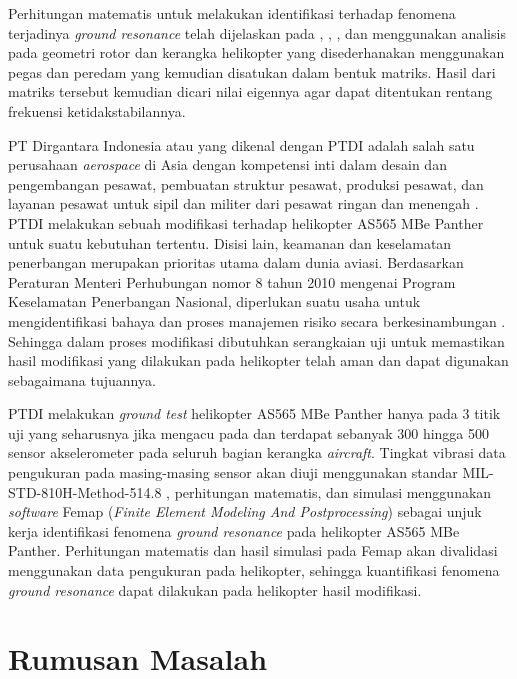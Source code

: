 Perhitungan matematis untuk melakukan identifikasi terhadap fenomena terjadinya \textit{ground resonance} telah dijelaskan pada \cite{Bergeot_passive}, \cite{BERGEOT201672}, \cite{borgesdasilva:hal-02188554}, dan \cite{DASIL} menggunakan analisis pada geometri rotor dan kerangka helikopter yang disederhanakan menggunakan pegas dan peredam yang kemudian disatukan dalam bentuk matriks. Hasil dari matriks tersebut kemudian dicari nilai eigennya agar dapat ditentukan rentang frekuensi ketidakstabilannya.

PT Dirgantara Indonesia atau yang dikenal dengan PTDI adalah salah satu perusahaan \textit{aerospace} di Asia dengan kompetensi inti dalam desain dan pengembangan pesawat, pembuatan struktur pesawat, produksi pesawat, dan layanan pesawat untuk sipil dan militer dari pesawat ringan dan menengah \cite{PTDI}. PTDI melakukan sebuah modifikasi terhadap helikopter AS565 MBe Panther untuk suatu kebutuhan tertentu. Disisi lain, keamanan dan keselamatan penerbangan merupakan prioritas utama dalam dunia aviasi. Berdasarkan Peraturan Menteri Perhubungan nomor 8 tahun 2010 mengenai Program Keselamatan Penerbangan Nasional, diperlukan suatu usaha untuk mengidentifikasi bahaya dan proses manajemen risiko secara berkesinambungan \cite{MenPerhub}. Sehingga dalam proses modifikasi dibutuhkan serangkaian uji untuk memastikan hasil modifikasi yang dilakukan pada helikopter telah aman dan dapat digunakan sebagaimana tujuannya.

PTDI melakukan \textit{ground test} helikopter AS565 MBe Panther hanya pada 3 titik uji yang seharusnya jika mengacu pada \cite{Ciavarella2018AnEH} dan \cite{lubrina:hal-01059708} terdapat sebanyak 300 hingga 500 sensor akselerometer pada seluruh bagian kerangka \textit{aircraft}. Tingkat vibrasi data pengukuran pada masing-masing sensor akan diuji menggunakan standar MIL-STD-810H-Method-514.8 \cite{MILSTD}, perhitungan matematis, dan simulasi menggunakan \textit{software} Femap (\textit{Finite Element Modeling And Postprocessing}) sebagai unjuk kerja identifikasi fenomena \textit{ground resonance} pada helikopter AS565 MBe Panther. Perhitungan matematis dan hasil simulasi pada Femap akan divalidasi menggunakan data pengukuran pada helikopter, sehingga kuantifikasi fenomena \textit{ground resonance} dapat dilakukan pada helikopter hasil modifikasi.

\section{Rumusan Masalah}
\label{sec:rumusan masalah}

